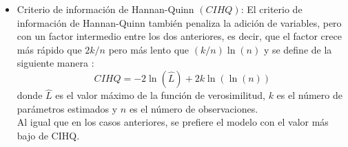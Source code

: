 \documentclass[12pt]{article}
\begin{document}
\begin{itemize}
    \item Criterio de información de Hannan-Quinn $(CIHQ)$: El criterio de información de Hannan-Quinn
    también penaliza la adición de variables, pero con un factor intermedio entre los dos anteriores, 
    es decir, que el factor crece más rápido que $2k/n$ pero más lento que $(k/n)\ln(n)$ 
    y se define de la siguiente manera \cite{hannan_determination_1979}:
    \begin{equation}
        CIHQ = -2 \ln(\hat{L}) + 2k\ln(\ln(n)) 
        \label{eq:cihq}
    \end{equation}
    donde $\hat{L}$ es el valor máximo de la función de verosimilitud, $k$ es el número de parámetros estimados 
    y $n$ es el número de observaciones.\\
    Al igual que en los casos anteriores, se prefiere el modelo con el valor más bajo de CIHQ.
\end{itemize}

\printbibliography

\end{document}
